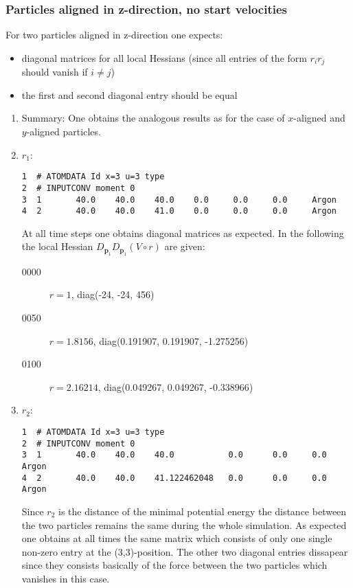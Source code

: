 \documentclass[a4paper]{article}
\newcommand{\boldp}{\boldsymbol{p}}
\begin{document}
\subsubsection{Particles aligned in z-direction, no start velocities}
\label{sec-1-4-3}
For two particles aligned in z-direction one expects:
\begin{itemize}
\item diagonal matrices for all local Hessians (since all entries of the form \(r_i r_j\) should vanish if \(i \neq j\))
\item the first and second diagonal entry should be equal
\end{itemize}
\begin{enumerate}
\item Summary:
\label{sec-1-4-3-1}
One obtains the analogous results as for the case of \(x\)-aligned and \(y\)-aligned particles.
\item \(r_1\):
\label{sec-1-4-3-2}
\begin{verbatim}
1  # ATOMDATA Id x=3 u=3 type
2  # INPUTCONV moment 0
3  1       40.0    40.0    40.0    0.0     0.0     0.0     Argon
4  2       40.0    40.0    41.0    0.0     0.0     0.0     Argon
\end{verbatim}
At all time steps one obtains diagonal matrices as expected.
In the following the local Hessian \(D_{\boldp_1} D_{\boldp_1} (V\circ r)\) are given:
\begin{description}
\item[{0000}] \(r = 1\), diag(-24, -24, 456)
\item[{0050}] \(r = 1.8156\), diag(0.191907, 0.191907,  -1.275256)
\item[{0100}] \(r = 2.16214\), diag(0.049267, 0.049267, -0.338966)
\end{description}
\item \(r_2\):
\label{sec-1-4-3-3}
\begin{verbatim}
1  # ATOMDATA Id x=3 u=3 type
2  # INPUTCONV moment 0
3  1       40.0    40.0    40.0           0.0      0.0     0.0     Argon
4  2       40.0    40.0    41.122462048   0.0      0.0     0.0     Argon
\end{verbatim}
Since \(r_2\) is the distance of the minimal potential energy the distance between the two particles remains the same during the whole simulation.
As expected one obtains at all times the same matrix which consists of only one single non-zero entry at the (3,3)-position.
The other two diagonal entries dissapear since they consists basically of the force between the two particles which vanishes in this case.

\end{enumerate}
\end{document}
